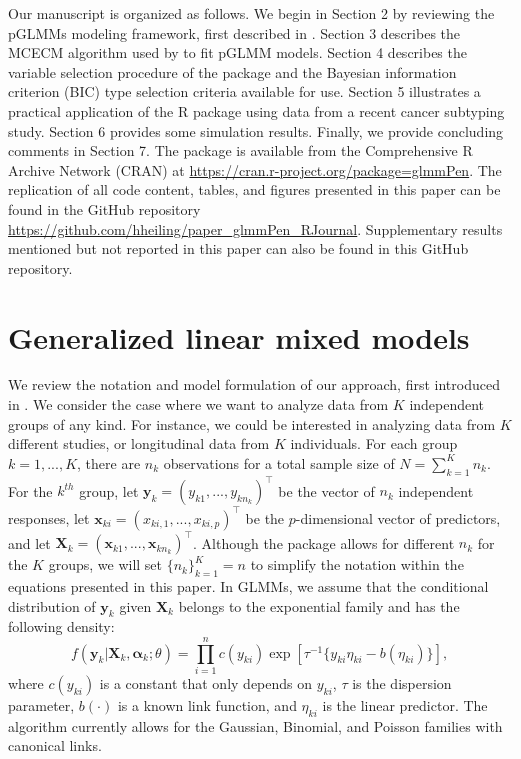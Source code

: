 Our manuscript is organized as follows. We begin in Section 2 by reviewing the pGLMMs modeling framework, first described in \cite{rashid2020}. Section 3 describes the MCECM algorithm used by  to fit pGLMM models. Section 4 describes the variable selection procedure of the package and the Bayesian information criterion (BIC) type selection criteria available for use. Section 5 illustrates a practical application of the  R package using data from a recent cancer subtyping study. Section 6 provides some simulation results. Finally, we provide concluding comments in Section 7. The package is available from the Comprehensive R Archive Network (CRAN) at \url{https://cran.r-project.org/package=glmmPen}. The replication of all code content, tables, and figures presented in this paper can be found in the GitHub repository \url{https://github.com/hheiling/paper_glmmPen_RJournal}. Supplementary results mentioned but not reported in this paper can also be found in this GitHub repository.

\section{Generalized linear mixed models}
\label{sec:modelinfo}

We review the notation and model formulation of our approach, first introduced in  \cite{rashid2020}. We consider the case where we want to analyze data from \(K\) independent groups of any kind. For instance, we could be interested in analyzing data from \(K\) different studies, or longitudinal data from \(K\) individuals. For each group \(k = 1,...,K\), there are \(n_k\) observations for a total sample size
of \(N = \sum_{k=1}^K n_k\). For the \(k^{th}\) group, let \(\boldsymbol y_k = (y_{k1},...,y_{kn_k})^\top\) be the vector of \(n_k\) independent responses, let
\(\boldsymbol x_{ki} = (x_{ki,1},...,x_{ki,p})^\top\) be the \(p\)-dimensional vector of predictors, and let
\(\boldsymbol X_k = (\boldsymbol x_{k1}, ..., \boldsymbol x_{kn_k})^\top\). Although the  package allows for different \(n_k\) for the
\(K\) groups, we will set \(\{n_k\}_{k=1}^K = n\) to simplify the notation within the equations presented in this paper. In GLMMs, we
assume that the conditional distribution of \(\boldsymbol y_k\) given \(\boldsymbol X_k\) belongs to the exponential family and has the
following density: \begin{equation}
  f(\boldsymbol y_k | \boldsymbol X_k, \boldsymbol \alpha_k; \theta) = 
    \prod_{i=1}^{n} c(y_{ki}) \exp[\tau^{-1} \{y_{ki} \eta_{ki} - b(\eta_{ki})\}],
    \label{eqn:exp_family}
\end{equation} where \(c(y_{ki})\) is a constant that only depends on
\(y_{ki}\), \(\tau\) is the dispersion parameter, \(b(\cdot)\) is a known
link function, and \(\eta_{ki}\) is the linear predictor. The  algorithm currently allows for the Gaussian, Binomial, and
Poisson families with canonical links.

